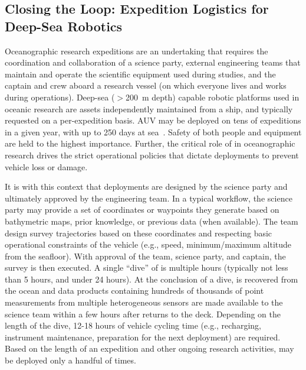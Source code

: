 \subsection{Closing the Loop: Expedition Logistics for Deep-Sea Robotics}
Oceanographic research expeditions are an undertaking that requires the coordination and collaboration of a science party, external engineering teams that maintain and operate the scientific equipment used during studies, and the captain and crew aboard a research vessel (on which everyone lives and works during operations). Deep-sea ($>$\SI{200}{\meter} depth) capable robotic platforms used in oceanic research are assets independently maintained from a ship, and typically requested on a per-expedition basis. AUV \Sentry may be deployed on tens of expeditions in a given year, with up to 250 days at sea~\autocite{kaiser2016design}. Safety of both people and equipment are held to the highest importance. Further, the critical role of \Sentry in oceanographic research drives the strict operational policies that dictate \Sentry deployments to prevent vehicle loss or damage.

It is with this context that \Sentry deployments are designed by the science party and ultimately approved by the \Sentry engineering team. In a typical workflow, the science party may provide a set of coordinates or waypoints they generate based on bathymetric maps, prior knowledge, or previous data (when available). The \Sentry team design survey trajectories based on these coordinates and respecting basic operational constraints of the vehicle (e.g., speed, minimum/maximum altitude from the seafloor). With approval of the \Sentry team, science party, and captain, the survey is then executed. A single ``dive'' of \Sentry is multiple hours (typically not less than 5 hours, and under 24 hours). At the conclusion of a dive, \Sentry is recovered from the ocean and data products containing hundreds of thousands of point measurements from multiple heterogeneous sensors are made available to the science team within a few hours after \Sentry returns to the deck. Depending on the length of the dive, 12-18 hours of vehicle cycling time (e.g., recharging, instrument maintenance, preparation for the next deployment) are required. Based on the length of an expedition and other ongoing research activities, \Sentry may be deployed only a handful of times.

